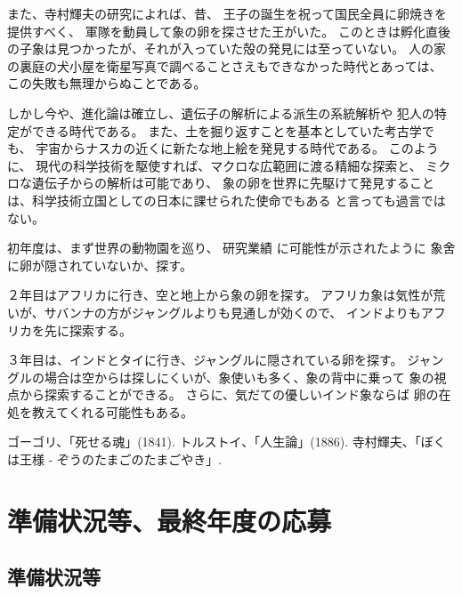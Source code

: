 \documentclass[11pt,a4paper,twoside]{jarticle}
\newcommand{\研究種別}{A}	%
\newcommand{\研究課題名}{コ・クリエイティブなソフトウェア開発のPBL型教育}
\newcommand{\研究機関名}{産業技術大学院大学}
\newcommand{\研究代表者氏名}{中鉢　欣秀}
\newcommand{\研究代表者氏名ふりがな}{ちゅうばち　よしひで}
\newcommand{\本応募effort}{\KLEffort{18}}	%
\newcommand{\研究期間の最終元号年度}{27}	%
\begin{document}
{	また、寺村輝夫の研究\cite{teramura}によれば、昔、
	王子の誕生を祝って国民全員に卵焼きを提供すべく、
	軍隊を動員して象の卵を探させた王がいた。
	このときは孵化直後の子象は見つかったが、それが入っていた殻の発見には至っていない。
	人の家の裏庭の犬小屋を衛星写真で調べることさえもできなかった時代とあっては、
	この失敗も無理からぬことである。
	
	しかし今や、進化論は確立し、遺伝子の解析による派生の系統解析や
	犯人の特定ができる時代である。
	また、土を掘り返すことを基本としていた考古学でも、
	宇宙からナスカの近くに新たな地上絵を発見する時代である。
	このように、
	現代の科学技術を駆使すれば、マクロな広範囲に渡る精細な探索と、
	ミクロな遺伝子からの解析は可能であり、
	象の卵を世界に先駆けて発見することは、科学技術立国としての日本に課せられた使命でもある
	と言っても過言ではない。

	初年度は、まず世界の動物園を巡り、
	研究業績 に可能性が示されたように
	象舍に卵が隠されていないか、探す。

	２年目はアフリカに行き、空と地上から象の卵を探す。
	アフリカ象は気性が荒いが、サバンナの方がジャングルよりも見通しが効くので、
	インドよりもアフリカを先に探索する。

	３年目は、インドとタイに行き、ジャングルに隠されている卵を探す。
	ジャングルの場合は空からは探しにくいが、象使いも多く、象の背中に乗って
	象の視点から探索することができる。
	さらに、気だての優しいインド象ならば
	卵の在処を教えてくれる可能性もある。
	
	\vspace{1cm}
	\begin{thebibliography}{99}
		 ゴーゴリ、「死せる魂」(1841).
		 トルストイ、「人生論」(1886).
		 寺村輝夫、「ぼくは王様 - ぞうのたまごのたまごやき」.
	\end{thebibliography}
}

\section{準備状況等、最終年度の応募}
\subsection{準備状況等}
\newcommand{\準備状況等}{%
	象の卵について、文献調査を行っている。
	Dr.~Seussは"Horton Hatches the Egg"という論文を1940年に発表している。
	また最近では2004年に、南カルフォニア大のSam Yousefianの率いる研究チームが "The Elephant's Egg"という記録映画を発表している。\\
	({\tt http://www.bangbang.tv/syelephant.html})

	我々はさらに一歩進め、研究の経過を紹介する「threeD」の
	ドキュメンタリー映画を作って全国でロードショーを行う。
}
\end{document}
